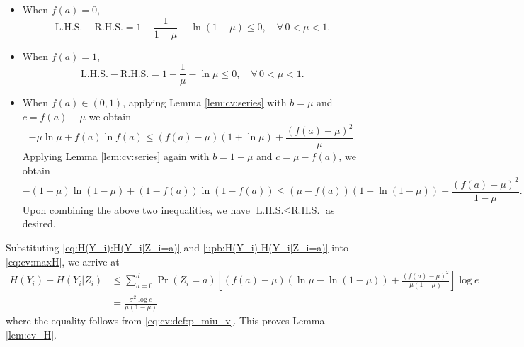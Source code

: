\documentclass[onecolumn,letterpaper]{IEEEtran}
\newcommand{\cy}{{Y}}
\newcommand{\etp}{{H}}
\newcommand{\cA}{{Z}}
\newcommand{\na}{{a}}
\newcommand{\mean}{{\mu}}
\newcommand{\var}{{\sigma^{2}}}
\newcommand{\vara}{{b}}
\newcommand{\varb}{{c}}
\newcommand{\LHS}{{\text{L.H.S.}}}
\newcommand{\RHS}{{\text{R.H.S.}}}
\begin{document}
\begin{itemize}
\item When $f(\na)=0$, 
\begin{equation*}
    \LHS - \RHS = 1 - \frac{1}{1-\mean} - \ln(1-\mean) \le 0,\quad \forall\, 0 < \mean< 1.
\end{equation*}
\item When $f(\na)=1$, 
\begin{equation*}
    \LHS - \RHS = 1 - \frac{1}{\mean} - \ln\mean \le 0,\quad \forall\, 0< \mean< 1.
\end{equation*}
\item When $f(\na) \in (0,1)$, applying Lemma \ref{lem:cv:series} with $\vara=\mean$ and $\varb = f(\na)-\mean$ we obtain  
\begin{equation*}
    -\mean \ln \mean + f(\na) \ln f(\na) \le (f(\na)-\mean) (1+\ln\mean ) + \frac{(f(\na)-\mean)^2}{\mean}.
\end{equation*}
Applying Lemma \ref{lem:cv:series} again with $\vara=1-\mean$ and $\varb=\mean-f(\na)$, we obtain  
\begin{equation*}
    -(1-\mean) \ln (1-\mean) + (1-f(\na)) \ln (1-f(\na)) \leq (\mean-f(\na)) (1+\ln(1-\mean)) + \frac{(f(\na)-\mean)^2}{1-\mean}. 
\end{equation*}
Upon combining the above two inequalities, we have $ \LHS \leq \RHS$ as desired.
\end{itemize}
Substituting \eqref{eq:H(Y_i):H(Y_i|Z_i=a)} and \eqref{upb:H(Y_i)-H(Y_i|Z_i=a)} into \eqref{eq:cv:maxH}, we arrive at
\begin{align*}
      \etp(\cy_i) - \etp(\cy_i|\cA_i)
    &\leq \sum\limits_{\na=0}^{d} \Pr(\cA_i=\na) \left[  \left(f(\na)-\mean\right) \left(\ln \mean - \ln(1-\mean)\right) + \frac{(f(\na)-\mean)^2}{\mean(1-\mean)}\right] \log e  \\
    &=\frac{\var \log e}{\mean(1-\mean)}
\end{align*}
where the equality follows from \eqref{eq:cv:def:p_miu_v}. This proves Lemma \ref{lem:cv_H}.%
\end{document}
